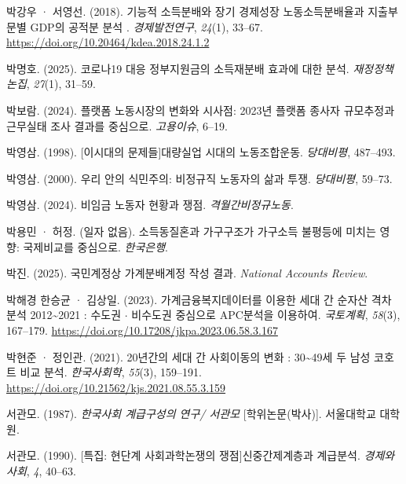\documentclass[
  letterpaper,
  DIV=11,
  numbers=noendperiod]{scrartcl}
\newlength{\cslhangindent}
\newenvironment{CSLReferences}[2] %
 {\begin{list}{}{%
  \setlength{\itemindent}{0pt}
  \setlength{\leftmargin}{0pt}
  \setlength{\parsep}{0pt}
  \ifodd #1
   \setlength{\leftmargin}{\cslhangindent}
   \setlength{\itemindent}{-1\cslhangindent}
  \fi
  \setlength{\itemsep}{#2\baselineskip}}}
 {\end{list}}
\begin{document}
\begin{CSLReferences}{1}{0}
박강우 · 서영선. (2018). {기능적 소득분배와 장기 경제성장
\texthorizontalbar{} 노동소득분배율과 지출부문별 GDP의 공적분 분석
\texthorizontalbar}. \emph{경제발전연구}, \emph{24}(1), 33--67.
\url{https://doi.org/10.20464/kdea.2018.24.1.2}

박명호. (2025). {코로나19 대응 정부지원금의 소득재분배 효과에 대한
분석}. \emph{재정정책논집}, \emph{27}(1), 31--59.

박보람. (2024). {플랫폼 노동시장의 변화와 시사점: 2023년 플랫폼 종사자
규모추정과 근무실태 조사 결과를 중심으로}. \emph{고용이슈}, 6--19.

박영삼. (1998). {{[}이시대의 문제들{]}대량실업 시대의 노동조합운동}.
\emph{당대비평}, 487--493.

박영삼. (2000). {우리 안의 식민주의: 비정규직 노동자의 삶과 투쟁}.
\emph{당대비평}, 59--73.

박영삼. (2024). {비임금 노동자 현황과 쟁점}. \emph{격월간비정규노동}.

박용민 · 허정. (일자 없음). {소득동질혼과 가구구조가 가구소득 불평등에
미치는 영향: 국제비교를 중심으로}. \emph{한국은행}.

박진. (2025). 국민계정상 가계분배계정 작성 결과. \emph{National Accounts
Review}.

박해경 한승균 · 김상일. (2023). {가계금융복지데이터를 이용한 세대 간
순자산 격차 분석 2012\textasciitilde2021 : 수도권 {\(\cdot\)} 비수도권
중심으로 APC분석을 이용하여}. \emph{국토계획}, \emph{58}(3), 167--179.
\url{https://doi.org/10.17208/jkpa.2023.06.58.3.167}

박현준 · 정인관. (2021). {20년간의 세대 간 사회이동의 변화 :
30\textasciitilde49세 두 남성 코호트 비교 분석}. \emph{한국사회학},
\emph{55}(3), 159--191.
\url{https://doi.org/10.21562/kjs.2021.08.55.3.159}

서관모. (1987). \emph{한국사회 계급구성의 연구/ 서관모}
{[}학위논문(박사){]}. 서울대학교 대학원.

서관모. (1990). {{[}특집: 현단계 사회과학논쟁의 쟁점{]}신중간제계층과
계급분석}. \emph{경제와사회}, \emph{4}, 40--63.


\end{CSLReferences}
\end{document}
